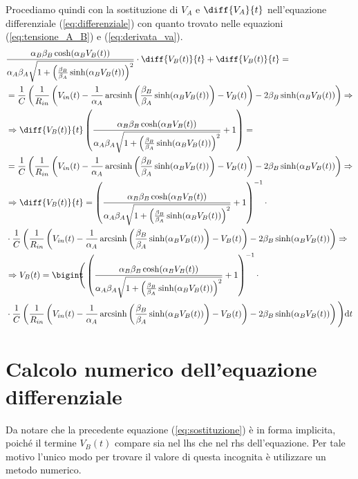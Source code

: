 		Procediamo quindi con la sostituzione di $V_{A}$ e $\diff{V_{A}}{t}$ nell'equazione differenziale (\ref{eq:differenziale}) con quanto trovato nelle equazioni (\ref{eq:tensione_A_B}) e (\ref{eq:derivata_va}).
		\begin{equation}
			\label{eq:integrale}
			\begin{split}
				&\frac{\alpha_{B}\beta_{B}\cosh(\alpha_{B}V_{B}(t))}{\alpha_{A}\beta_{A}\sqrt{1+\left(\frac{\beta_{B}}{\beta_{A}}\sinh(\alpha_{B}V_{B}(t))\right)^{2}}}\cdot\diff{V_{B}(t)}{t}+\diff{V_{B}(t)}{t} =\\&= \frac{1}{C}\left(\frac{1}{R_{in}}\left(V_{in}(t)-\frac{1}{\alpha_{A}} \arcsinh \left(\frac{\beta_{B}}{\beta_{A}} \sinh(\alpha_{B}V_{B}(t))\right)-V_{B}(t)\right)-2\beta_{B}\sinh(\alpha_{B}V_{B}(t))\right)\Rightarrow\\
				&\Rightarrow \diff{V_{B}(t)}{t}\left(\frac{\alpha_{B}\beta_{B}\cosh(\alpha_{B}V_{B}(t))}{\alpha_{A}\beta_{A}\sqrt{1+\left(\frac{\beta_{B}}{\beta_{A}}\sinh(\alpha_{B}V_{B}(t))\right)^{2}}}+1\right) =\\&= \frac{1}{C}\left(\frac{1}{R_{in}}\left(V_{in}(t)-\frac{1}{\alpha_{A}} \arcsinh \left(\frac{\beta_{B}}{\beta_{A}} \sinh(\alpha_{B}V_{B}(t))\right)-V_{B}(t)\right)-2\beta_{B}\sinh(\alpha_{B}V_{B}(t))\right)\Rightarrow\\
				&\Rightarrow \diff{V_{B}(t)}{t} = \left(\frac{\alpha_{B}\beta_{B}\cosh(\alpha_{B}V_{B}(t))}{\alpha_{A}\beta_{A}\sqrt{1+\left(\frac{\beta_{B}}{\beta_{A}}\sinh(\alpha_{B}V_{B}(t))\right)^{2}}}+1\right)^{-1}\cdot\\&\cdot\frac{1}{C}\left(\frac{1}{R_{in}}\left(V_{in}(t)-\frac{1}{\alpha_{A}} \arcsinh \left(\frac{\beta_{B}}{\beta_{A}} \sinh(\alpha_{B}V_{B}(t))\right)-V_{B}(t)\right)-2\beta_{B}\sinh(\alpha_{B}V_{B}(t))\right)\Rightarrow\\
				&\Rightarrow V_{B}(t) = \Int{\Bigg(\left(\frac{\alpha_{B}\beta_{B}\cosh(\alpha_{B}V_{B}(t))}{\alpha_{A}\beta_{A}\sqrt{1+\left(\frac{\beta_{B}}{\beta_{A}}\sinh(\alpha_{B}V_{B}(t))\right)^{2}}}+1\right)^{-1}\cdot\\&\cdot\frac{1}{C}\left(\frac{1}{R_{in}}\left(V_{in}(t)-\frac{1}{\alpha_{A}} \arcsinh \left(\frac{\beta_{B}}{\beta_{A}} \sinh(\alpha_{B}V_{B}(t))\right)-V_{B}(t)\right)-2\beta_{B}\sinh(\alpha_{B}V_{B}(t))\right)\Bigg)}{t}\\
			\end{split}
		\end{equation}
		\pagebreak
		
	\section{Calcolo numerico dell'equazione differenziale}
		Da notare che la precedente equazione (\ref{eq:sostituzione}) è in forma implicita, poiché il termine $V_{B}(t)$ compare sia nel lhs che nel rhs dell'equazione. Per tale motivo l'unico modo per trovare il valore di questa incognita è utilizzare un metodo numerico.
		
